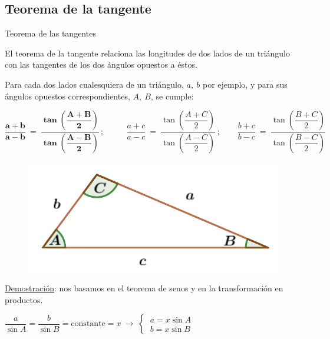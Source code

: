 \vspace{5mm} 


\subsection{Teorema de la tangente}
\vspace{0.2cm}


\begin{myexampleblock}{Teorema de las tangentes}


\begin{theorem} 
	
El teorema de la tangente relaciona las longitudes de dos lados de un triángulo con las tangentes de los dos ángulos opuestos a éstos.

\begin{multicols}{2}
Para cada dos lados cualesquiera de un triángulo, $a,\ b$ por ejemplo, y para sus ángulos opuestos correspondientes, $A,\ B$, se cumple:

$$\boldsymbol{ \dfrac{a+b}{a-b} \ = \ \dfrac{ \tan \left( \dfrac{A+B}{2} \right) }{  \tan \left( \dfrac{A-B}{2} \right) } }\, ; \ \ \  \qquad 
\dfrac{a+c}{a-c} \ = \ \dfrac{ \tan \left( \dfrac{A+C}{2} \right) }{  \tan \left( \dfrac{A-C}{2} \right) }  \, ; \qquad
\dfrac{b+c}{b-c} \ = \ \dfrac{ \tan \left( \dfrac{B+C}{2} \right) }{  \tan \left( \dfrac{B-C}{2} \right) }  
$$

\begin{figure}[H]
	\centering
	\includegraphics[width=.4\textwidth]{img-triang/triang01.png}
\end{figure}	
\end{multicols}
\end{theorem}


\underline{Demostración}: nos basamos en el teorema de senos y en la transformación en productos.

\vspace{2mm} $\dfrac{a}{\sin A}=\dfrac{b}{\sin B}=\text{constante}=x \ \to \ \begin{cases} \ a=x\sin A \\ \ b=x\sin B \end{cases}$


\end{myexampleblock}
